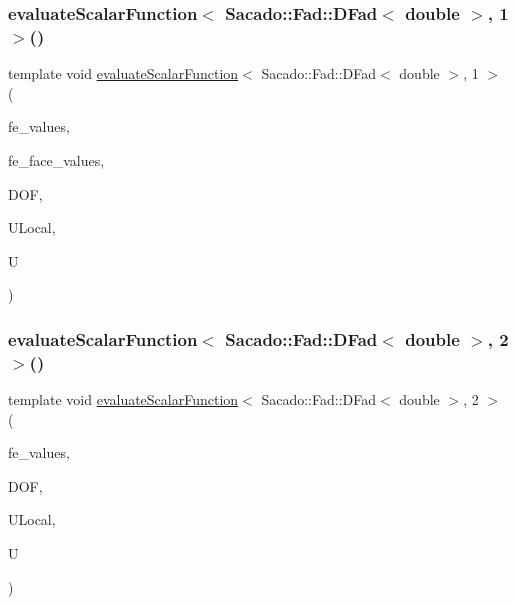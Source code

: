 \subsubsection{\texorpdfstring{evaluate\+Scalar\+Function$<$ Sacado\+::\+Fad\+::\+D\+Fad$<$ double $>$, 1 $>$()}{evaluateScalarFunction< Sacado::Fad::DFad< double >, 1 >()}\hspace{0.1cm}{\footnotesize\ttfamily [2/2]}}
{\footnotesize\ttfamily template void \mbox{\hyperlink{group___evaluation_functions_ga2e2fbeb2173113c6889c73bbb7304789}{evaluate\+Scalar\+Function}}$<$ Sacado\+::\+Fad\+::\+D\+Fad$<$ double $>$, 1 $>$ (\begin{DoxyParamCaption}\item[{const F\+E\+Values$<$ 1 $>$ \&}]{fe\+\_\+values,  }\item[{const F\+E\+Face\+Values$<$ 1 $>$ \&}]{fe\+\_\+face\+\_\+values,  }\item[{unsigned int}]{D\+OF,  }\item[{Table$<$ 1, Sacado\+::\+Fad\+::\+D\+Fad$<$ double $>$$>$ \&}]{U\+Local,  }\item[{Table$<$ 1, Sacado\+::\+Fad\+::\+D\+Fad$<$ double $>$$>$ \&}]{U }\end{DoxyParamCaption})}

\mbox{\label{function_evaluations_8cc_af8ed01aa7f3c36625c149e3600d96714}} 
\subsubsection{\texorpdfstring{evaluate\+Scalar\+Function$<$ Sacado\+::\+Fad\+::\+D\+Fad$<$ double $>$, 2 $>$()}{evaluateScalarFunction< Sacado::Fad::DFad< double >, 2 >()}\hspace{0.1cm}{\footnotesize\ttfamily [1/2]}}
{\footnotesize\ttfamily template void \mbox{\hyperlink{group___evaluation_functions_ga2e2fbeb2173113c6889c73bbb7304789}{evaluate\+Scalar\+Function}}$<$ Sacado\+::\+Fad\+::\+D\+Fad$<$ double $>$, 2 $>$ (\begin{DoxyParamCaption}\item[{const F\+E\+Values$<$ 2 $>$ \&}]{fe\+\_\+values,  }\item[{unsigned int}]{D\+OF,  }\item[{Table$<$ 1, Sacado\+::\+Fad\+::\+D\+Fad$<$ double $>$$>$ \&}]{U\+Local,  }\item[{Table$<$ 1, Sacado\+::\+Fad\+::\+D\+Fad$<$ double $>$$>$ \&}]{U }\end{DoxyParamCaption})}

